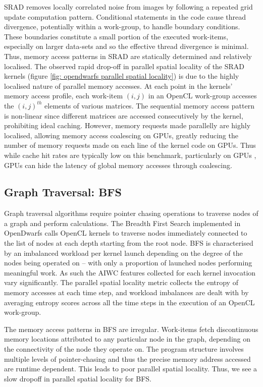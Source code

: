 \documentclass[review=false, sigchi]{acmart}
\begin{document}
	SRAD removes locally correlated noise from images by following a repeated grid update computation pattern. Conditional statements in the code cause thread divergence, potentially within a work-group, to handle boundary conditions. These boundaries constitute a small portion of the executed work-items, especially on larger data-sets and so the effective thread divergence is minimal. Thus, memory access patterns in SRAD are statically determined and relatively localised. The observed rapid drop-off in parallel spatial locality of the SRAD kernels (figure \ref{fig: opendwarfs parallel spatial locality}) is due to the highly localised nature of parallel memory accesses. At each point in the kernels' memory access profile, each work-item $(i,j)$ in an OpenCL work-group accesses the $(i,j)^{th}$ elements of various matrices. The sequential memory access pattern is non-linear since different matrices are accessed consecutively by the kernel, prohibiting ideal caching. However, memory requests made parallelly are highly localised, allowing memory access coalescing on GPUs, greatly reducing the number of memory requests made on each line of the kernel code on GPUs. Thus while cache hit rates are typically low on this benchmark, particularly on GPUs \cite{krommydas2016opendwarfs}, GPUs can hide the latency of global memory accesses through coalescing.
	
	\subsection{Graph Traversal: BFS}
	
	Graph traversal algorithms require pointer chasing operations to traverse nodes of a graph and perform calculations. The Breadth First Search implemented in OpenDwarfs calls OpenCL kernels to traverse nodes immediately connected to the list of nodes at each depth starting from the root node. BFS is characterised by an imbalanced workload per kernel launch depending on the degree of the nodes being operated on -- with only a proportion of launched nodes performing meaningful work. As such the AIWC features collected for each kernel invocation vary significantly. The parallel spatial locality metric collects the entropy of memory accesses at each time step, and workload imbalances are dealt with by averaging entropy scores across all the time steps in the execution of an OpenCL work-group. 
	
	The memory access patterns in BFS are irregular. Work-items fetch discontinuous memory locations attributed to any particular node in the graph, depending on the connectivity of the node they operate on. The program structure involves multiple levels of pointer-chasing and thus the precise memory address accessed are runtime dependent. This leads to poor parallel spatial locality. Thus, we see a slow dropoff in parallel spatial locality for BFS.
	
\end{document}
